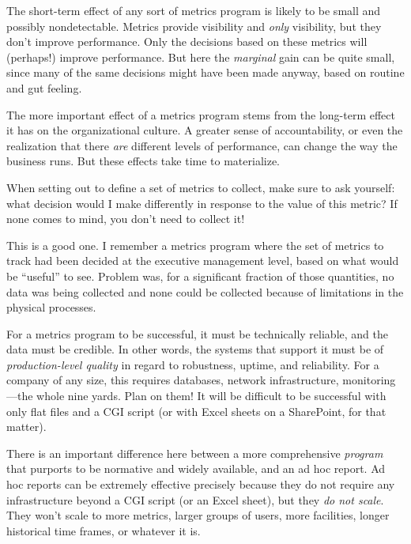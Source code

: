 The short-term effect of any sort of metrics program is likely to be
small and possibly nondetectable. Metrics provide visibility and
\emph{only} visibility, but they don't improve performance. Only the
decisions based on these metrics will (perhaps!) improve performance.
But here the \emph{marginal} gain can be quite small, since many of
the same decisions might have been made anyway, based on routine and
gut feeling.
	
The more important effect of a metrics program stems from the
long-term effect it has on the organizational culture. A greater sense
of accountability, or even the realization that there \emph{are}
different levels of performance, can change the way the business runs.
But these effects take time to materialize.

When setting out to define a set of metrics to collect, make sure to
ask yourself: what decision would I make differently in response to
the value of this metric? If none comes to mind, you don't need to
collect it!

This is a good one.  I remember a metrics program where the set of
metrics to track had been decided at the executive management level,
based on what would be ``useful'' to see. Problem was, for a
significant fraction of those quantities, no data was being collected
and none could be collected because of limitations in the physical
processes.

For a metrics program to be successful, it must be technically
reliable, and the data must be credible. In other words, the systems
that support it must be of \emph{production-level quality} in regard
to robustness, uptime, and reliability. For a company of any size,
this requires databases, network infrastructure, monitoring---the
whole nine yards.  Plan on them! It will be difficult to be successful
with only flat files and a CGI script (or with Excel sheets on a
SharePoint, for that matter).

There is an important difference here between a more comprehensive
\emph{program} that purports to be normative and widely available, and
an ad hoc report.  Ad hoc reports can be extremely effective precisely
because they do not require any infrastructure beyond a CGI script (or
an Excel sheet), but they \emph{do not scale}. They won't scale to
more metrics, larger groups of users, more facilities, longer
historical time frames, or whatever it is.

